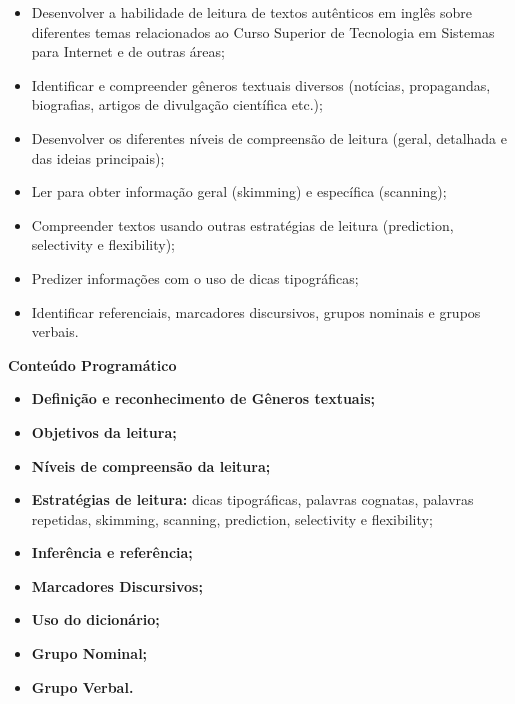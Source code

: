 \begin{itemize}

\item Desenvolver a habilidade de leitura de textos autênticos em inglês sobre diferentes temas relacionados ao Curso Superior de Tecnologia em Sistemas para Internet e de outras áreas;

\item Identificar e compreender gêneros textuais diversos (notícias, propagandas, biografias, artigos de divulgação científica etc.);

\item Desenvolver os diferentes níveis de compreensão de leitura (geral, detalhada e das ideias principais);

\item Ler para obter informação geral (skimming) e específica (scanning);

\item Compreender textos usando outras estratégias de leitura (prediction, selectivity e 
flexibility);

\item Predizer informações com o uso de dicas tipográficas;

\item Identificar referenciais, marcadores discursivos, grupos nominais e grupos verbais.

\end{itemize} 


\begin{snugshade}\begin{center}\textbf{
    Conteúdo Programático
}\end{center}\end{snugshade}

\begin{itemize}

\item \textbf{Definição e reconhecimento de Gêneros textuais;}

\item \textbf{Objetivos da leitura;}

\item \textbf{Níveis de compreensão da leitura;}

\item \textbf{Estratégias de leitura:} 
dicas tipográficas, palavras cognatas, palavras repetidas, skimming, scanning, prediction, selectivity e flexibility;

\item \textbf{Inferência e referência;}

\item \textbf{Marcadores Discursivos;}

\item \textbf{Uso do dicionário;}

\item \textbf{Grupo Nominal;}

\item \textbf{Grupo Verbal.}

\end{itemize}

